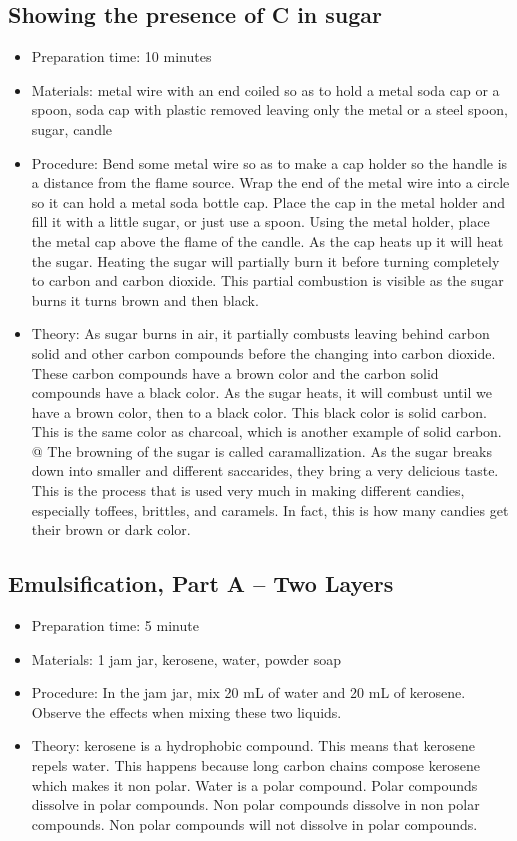 \subsection{Showing the presence of C in sugar}
\begin{itemize}
\item{Preparation time: 10 minutes}
\item{Materials: metal wire with an end coiled so as to hold a metal soda cap or a spoon, soda cap with plastic removed leaving only the metal or a steel spoon, sugar, candle}
\item{Procedure: Bend some metal wire so as to make a cap holder so the handle is a distance from the flame source. Wrap the end of the metal wire into a circle so it can hold a metal soda bottle cap. Place the cap in the metal holder and fill it with a little sugar, or just use a spoon. Using the metal holder, place the metal cap above the flame of the candle. As the cap heats up it will heat the sugar. Heating the sugar will partially burn it before turning completely to carbon and carbon dioxide. This partial combustion is visible as the sugar burns it turns brown and then black.}
\item{Theory:  As sugar burns in air, it partially combusts leaving behind carbon solid and other carbon compounds before the changing into carbon dioxide. These carbon compounds have a brown color and the carbon solid compounds have a black color. As the sugar heats, it will combust until we have a brown color, then to a black color. This black color is solid carbon. This is the same color as charcoal, which is another example of solid carbon. @	The browning of the sugar is called caramallization. As the sugar breaks down into smaller and different saccarides, they bring a very delicious taste. This is the process that is used very much in making different candies, especially toffees, brittles, and caramels. In fact, this is how many candies get their brown or dark color.}
\end{itemize}

\subsection{Emulsification, Part A – Two Layers}
\begin{itemize}
\item{Preparation time: 5 minute}
\item{Materials: 1 jam jar, kerosene, water, powder soap}
\item{Procedure: In the jam jar, mix 20 mL of water and 20 mL of kerosene. Observe the effects when mixing these two liquids.}
\item{Theory: kerosene is a hydrophobic compound. This means that kerosene repels water. This happens because long carbon chains compose kerosene which makes it non polar. Water is a polar compound. Polar compounds dissolve in polar compounds. Non polar compounds dissolve in non polar compounds. Non polar compounds will not dissolve in polar compounds.}
\end{itemize}

